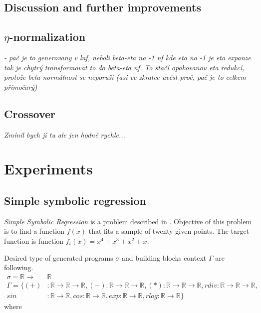 \documentclass{llncs}
\newcommand{\ar}{\rightarrow\xspace}
\newcommand{\Real}{\mathbb{R}}
\begin{document}
\subsection{Discussion and further improvements}

\subsection{$\eta$-normalization}

\textit{- pač je to generovany v lnf, neboli beta-eta na -1 nf kde 
eta na -1 je eta expanze tak je chytrý transformovat 
to do beta-eta nf. To stačí opakovanou eta redukcí, protože beta normálnost
se neporuší (asi ve zkratce uvést proč, pač je to celkem přímočarý) 
}

\subsection{Crossover}

\textit{Zmínil bych jí tu ale jen hodně rychle...}

\section{Experiments}
\subsection{Simple symbolic regression}

\textit{Simple Symbolic Regression} is a problem described
in \cite{koza92}. Objective of this problem is to 
find a function $f(x)$ that fits a sample
of twenty given points. The target function is 
function $f_{t}(x) = x^4 + x^3 + x^2 + x$.  

Desired type of generated programs $\sigma$ and 
building blocks context $\Gamma$ are following.
\begin{align*}
\sigma = \Real \ar &\Real\\
\Gamma = \{
  (+)  &: \Real \ar \Real \ar \Real    ,
  (-)   : \Real \ar \Real \ar \Real    ,
  (*)   : \Real \ar \Real \ar \Real    ,
  rdiv  : \Real \ar \Real \ar \Real    ,\\
  sin  &: \Real \ar \Real              ,
  cos   : \Real \ar \Real              ,
  exp   : \Real \ar \Real              , 
  rlog  : \Real \ar \Real              \}
\end{align*}
where
\end{document}
